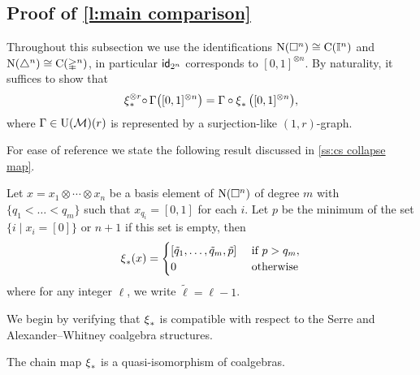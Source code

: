\subsection{Proof of \cref{l:main comparison}} \label{ss:comparison proof}

Throughout this subsection we use the identifications $\operatorname{N}(\square^n) \cong \operatorname{C}(\mathbb{I}^n)$ and $\operatorname{N}(\triangle^n) \cong \operatorname{C}(\mathbb{\Delta}^n)$, in particular $\mathsf{id}_{2^n}$ corresponds to $[0,1]^{\otimes n}$.
By naturality, it suffices to show that
\begin{equation} \label{e:Cartan--Serre E-coalgebra map}
\operatorname{\xi}_\ast^{\otimes r} \! \circ \, \Gamma \big( [0,1]^{\otimes n} \big) =
\Gamma \circ \operatorname{\xi}_\ast \big( [0,1]^{\otimes n} \big),
\end{equation}
where $\Gamma \in {\operatorname{U}(\mathcal{M})}(r)$ is represented by a surjection-like $(1,r)$-graph.

For ease of reference we state the following result discussed in \cref{ss:cs collapse map}.

\begin{lemma} \label{l:cs collapse chain map explicit}
	Let $x = x_1 \otimes \cdots \otimes x_n$ be a basis element of $\operatorname{N}(\square^n)$ of degree $m$ with $\{q_1 < \dots < q_m\}$ such that $x_{q_i} = [0,1]$ for each $i$.
	Let $p$ be the minimum of the set $\{i \mid x_i = [0]\}$ or $n+1$ if this set is empty, then
	\[
	\operatorname{\xi}_\ast(x) = \begin{cases}
	[\tilde q_1, \dots, \tilde q_m, \tilde p] & \text{ if } p > q_m, \\
	0 & \text{ otherwise}
	\end{cases}
	\]
	where for any integer $\ell$, we write $\tilde \ell = \ell-1$.
\end{lemma}

We begin by verifying that $\operatorname{\xi}_\ast$ is compatible with respect to the Serre and Alexander--Whitney coalgebra structures.

\begin{lemma}
	The chain map $\operatorname{\xi}_\ast$ is a quasi-isomorphism of coalgebras.
\end{lemma}


